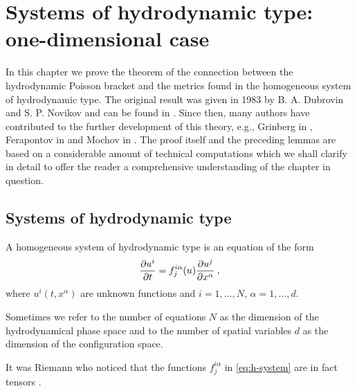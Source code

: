 \chapter{Systems of hydrodynamic type: one-dimensional case}

In this chapter we prove the theorem of the connection between the hydrodynamic Poisson bracket and the metrics found in the homogeneous system of hydrodynamic type. The original result was given in 1983 by B. A. Dubrovin and S. P. Novikov and can be found in \cite{Dubrovin-Novikov}. Since then, many authors have contributed to the further development of this theory, e.g., Grinberg in \cite{Grinberg}, Ferapontov in \cite{Ferapontov} and Mochov in \cite{Mochov}.
The proof itself and the preceding lemmas are based on a considerable amount of technical computations which we shall clarify in detail to offer the reader a comprehensive understanding of the chapter in question.


\section{Systems of hydrodynamic type}

\begin{definition}
    A homogeneous system of hydrodynamic type is an equation of the form
    \begin{align}
        \label{eq:h-system}
        \frac{\partial u^i}{\partial t} = f_j^{i \alpha} (u) \frac{\partial u^j}{\partial x^\alpha} \:,
    \end{align}
    where $u^i(t,x^\alpha)$ are unknown functions and $i = 1, \dots , N$, $\alpha = 1, \dots , d$.
\end{definition}

Sometimes we refer to the number of equations $N$ as the dimension of the hydrodynamical phase space and to the number of spatial variables $d$ as the dimension of the configuration space.

It was Riemann who noticed that the functions $f^{i \alpha}_j$ in \eqref{eq:h-system} are in fact tensors \cite{Dubrovin-Novikov}.

